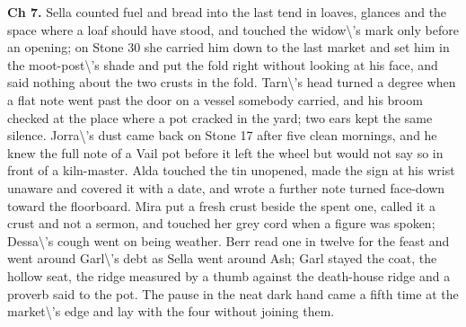 \documentclass{design/chronicle}
\begin{document}
{\textbf{Ch 7.} Sella counted fuel and bread into the last tend in loaves, glances and the space where a loaf should have stood, and touched the widow\textbackslash{}’s mark only before an opening; on Stone 30 she carried him down to the last market and set him in the moot-post\textbackslash{}’s shade and put the fold right without looking at his face, and said nothing about the two crusts in the fold. Tarn\textbackslash{}’s head turned a degree when a flat note went past the door on a vessel somebody carried, and his broom checked at the place where a pot cracked in the yard; two ears kept the same silence. Jorra\textbackslash{}’s dust came back on Stone 17 after five clean mornings, and he knew the full note of a Vail pot before it left the wheel but would not say so in front of a kiln-master. Alda touched the tin unopened, made the sign at his wrist unaware and covered it with a date, and wrote a further note turned face-down toward the floorboard. Mira put a fresh crust beside the spent one, called it a crust and not a sermon, and touched her grey cord when a figure was spoken; Dessa\textbackslash{}’s cough went on being weather. Berr read one in twelve for the feast and went around Garl\textbackslash{}’s debt as Sella went around Ash; Garl stayed the coat, the hollow seat, the ridge measured by a thumb against the death-house ridge and a proverb said to the pot. The pause in the neat dark hand came a fifth time at the market\textbackslash{}’s edge and lay with the four without joining them.

}
\end{document}
